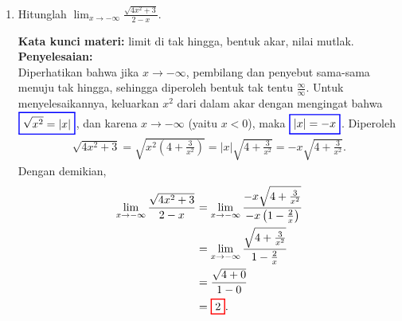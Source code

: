 \documentclass[10pt,openany,a4paper]{article}
\theoremstyle{definition}
\theoremstyle{definition}
\theoremstyle{plain}
\newenvironment{jawab}[2][tes]{%
\par\noindent\textbf{Kata kunci materi:} #1.\\
\textbf{Penyelesaian:} #2%
}{}
\begin{document}
\begin{enumerate}
    \item Hitunglah $\displaystyle\lim_{x\to-\infty}\frac{\sqrt{4x^2+3}}{2-x}$.
    \begin{jawab}[limit di tak hingga, bentuk akar, nilai mutlak]{~\\
        Diperhatikan bahwa jika $x\to-\infty$, pembilang dan penyebut sama-sama menuju tak hingga, sehingga diperoleh bentuk tak tentu $\frac{\infty}{\infty}$. Untuk menyelesaikannya, keluarkan $x^2$ dari dalam akar dengan mengingat bahwa $\colorlet{oldcolor}{.}
        \color{blue}
        \setlength{\fboxrule}{1pt} \boxed{\color{oldcolor}\sqrt{x^2}=|x|}\color{oldcolor}$, dan karena $x\to-\infty$ (yaitu $x<0$), maka $\colorlet{oldcolor}{.}
        \color{blue}
        \setlength{\fboxrule}{1pt} \boxed{\color{oldcolor}|x|=-x}\color{oldcolor}$. Diperoleh
        \begin{align*}
            \sqrt{4x^2+3} = \sqrt{x^2\left(4+\frac{3}{x^2}\right)} = |x|\sqrt{4+\frac{3}{x^2}} = -x\sqrt{4+\frac{3}{x^2}}.
        \end{align*}
        Dengan demikian,
        \begin{align*}
            \lim_{x\to-\infty}\frac{\sqrt{4x^2+3}}{2-x} &= \lim_{x\to-\infty}\frac{-x\sqrt{4+\frac{3}{x^2}}}{-x\left(1-\frac{2}{x}\right)}\\
            &= \lim_{x\to-\infty}\frac{\sqrt{4+\frac{3}{x^2}}}{1-\frac{2}{x}}\\
            &= \frac{\sqrt{4+0}}{1-0}\\
            &= \colorlet{oldcolor}{.}
        \color{red}
        \setlength{\fboxrule}{1pt} \boxed{\color{oldcolor}2}\color{oldcolor}.
        \end{align*}
    }
    \end{jawab}


\end{enumerate}
\end{document}
